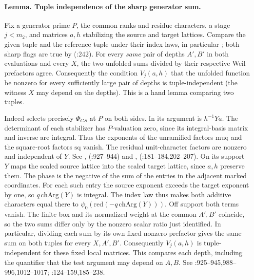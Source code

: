 \paragraph{Lemma. Tuple independence of the sharp generator sum.}\label{r13:tuple-independence}
Fix a generator prime $P$, the common ranks and residue characters,
a stage $j<m_2$, and matrices $a,h$ stabilizing the source and target
lattices. Compare the given tuple and the reference tuple under their
index laws, in particular ; both sharp flags are
true by 
(:242).
For every \emph{same} pair of depths $A',B'$ in both evaluations
and every $X$, the two unfolded sums divided by their respective
Weil prefactors agree. Consequently the condition $V_j(a,h)$ that
the unfolded function be nonzero for every sufficiently large pair
of depths is tuple-independent (the witness $X$ may depend on the
depths). This is a hand lemma comparing two tuples.

Indeed  selects precisely $\Phi_{GS}$ at $P$ on both
sides. In  its argument is $h^{-1}Ya$. The determinant
of each stabilizer has $P$-valuation zero, since its integral-basis
matrix and inverse are integral. Thus the exponents of the unramified
factors $\mathrm{muq}$ and the square-root factors $\mathrm{sq}$ vanish.
The residual unit-character factors are nonzero and independent of $Y$.
See , 
(:927--944) and
, 
(:181--184,202--207).
On its support $Y$ maps the scaled source lattice into the scaled
target lattice, since $a,h$ preserve them. The phase is the negative
of the sum of the entries in the adjacent marked coordinates. For
each such entry the source exponent exceeds the target exponent by
one, so $q\,\mathrm{chArg}(Y)$ is integral. The index law
 thus makes both additive characters equal there to
$\psi_0(\mathrm{red}(-q\,\mathrm{chArg}(Y)))$. Off support both
terms vanish. The finite box and its normalized weight at the common
$A',B'$ coincide, so the two sums differ only by the nonzero scalar
ratio just identified. In particular, dividing each sum by its own fixed nonzero prefactor gives the same sum on both tuples for every $X,A',B'$. Consequently $V_j(a,h)$ is tuple-independent
for these fixed local matrices. This compares each depth, including
the quantifier that the test argument may depend on $A,B$.
See :925--945,988--996,1012--1017;
:124--159,185--238.

